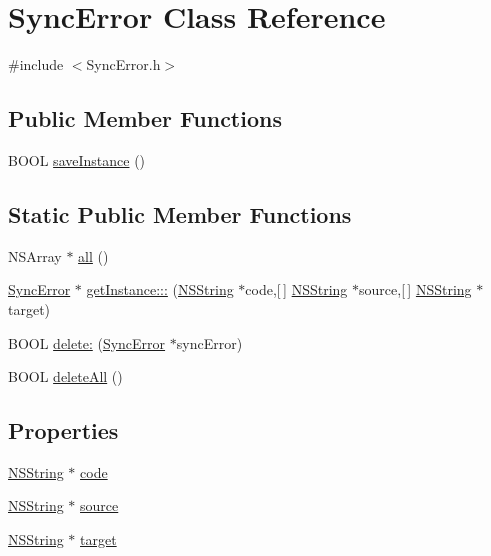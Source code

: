 \hypertarget{interface_sync_error}{
\section{\-Sync\-Error \-Class \-Reference}
\label{interface_sync_error}
}


{\ttfamily \#include $<$\-Sync\-Error.\-h$>$}

\subsection*{\-Public \-Member \-Functions}
\begin{DoxyCompactItemize}
\item 
\-B\-O\-O\-L \hyperlink{interface_sync_error_a18a2a094cabebb608f72098130f277d5}{save\-Instance} ()
\end{DoxyCompactItemize}
\subsection*{\-Static \-Public \-Member \-Functions}
\begin{DoxyCompactItemize}
\item 
\-N\-S\-Array $\ast$ \hyperlink{interface_sync_error_a48b5cfa4542126a7f7edcf177c54203b}{all} ()
\item 
\hyperlink{interface_sync_error}{\-Sync\-Error} $\ast$ \hyperlink{interface_sync_error_aef9cd2051983d49fca8e2836d12298ce}{get\-Instance\-:::} (\hyperlink{class_n_s_string}{\-N\-S\-String} $\ast$code,\mbox{[}$\,$\mbox{]} \hyperlink{class_n_s_string}{\-N\-S\-String} $\ast$source,\mbox{[}$\,$\mbox{]} \hyperlink{class_n_s_string}{\-N\-S\-String} $\ast$target)
\item 
\-B\-O\-O\-L \hyperlink{interface_sync_error_a729186c1909269fba998ca3aa69802f0}{delete\-:} (\hyperlink{interface_sync_error}{\-Sync\-Error} $\ast$sync\-Error)
\item 
\-B\-O\-O\-L \hyperlink{interface_sync_error_a50f982f5294f04bfcecbac4f6740da29}{delete\-All} ()
\end{DoxyCompactItemize}
\subsection*{\-Properties}
\begin{DoxyCompactItemize}
\item 
\hyperlink{class_n_s_string}{\-N\-S\-String} $\ast$ \hyperlink{interface_sync_error_a262f3e0883b59db9797fa0b4ee079716}{code}
\item 
\hyperlink{class_n_s_string}{\-N\-S\-String} $\ast$ \hyperlink{interface_sync_error_a2afbdf877722b936ba239d7d9eef7631}{source}
\item 
\hyperlink{class_n_s_string}{\-N\-S\-String} $\ast$ \hyperlink{interface_sync_error_a213373ca10f69e4e7def8f9cfab3c542}{target}
\end{DoxyCompactItemize}


